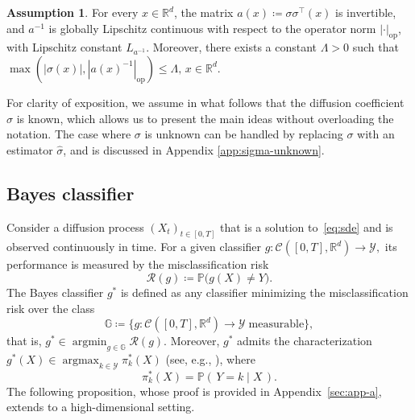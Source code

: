 \documentclass{article}
\theoremstyle{plain}
\theoremstyle{definition}
\newtheorem{assumption}[theorem]{Assumption}
\theoremstyle{remark}
\newcommand{\RD}{\mathbb{R}^{d}}
\DeclareMathOperator*{\argmax}{argmax}
\DeclareMathOperator*{\argmin}{argmin}
\begin{document}
\begin{assumption}\label{assump:main-theorem}
For every $x \in \mathbb{R}^d$, the matrix $a(x) \coloneqq \sigma\sigma^{\top}(x)$ is invertible, and $a^{-1}$ is globally Lipschitz continuous with respect to the operator norm $|\cdot|_{\mathrm{op}}$, with Lipschitz constant $L_{a^{-1}}$. Moreover, there exists a constant $\Lambda > 0$ such that $\max(|\sigma(x)|,|a(x)^{-1}|_{\mathrm{op}}) \leq \Lambda, \,x\in\RD$.
\end{assumption}


For clarity of exposition, we assume in what follows that the diffusion coefficient $\sigma$ is known, which allows us to present the main ideas without overloading the notation. The case where $\sigma$ is unknown can be handled by replacing $\sigma$ with an estimator $\widehat{\sigma}$, and is discussed in Appendix \ref{app:sigma-unknown}.



\subsection{Bayes classifier}
Consider a diffusion process $(X_t)_{t\in[0,T]}$ that is a solution to~\eqref{eq:sde}
and is observed continuously in time. For a given classifier
$
g : \mathcal{C}([0,T],\mathbb{R}^d) \to \mathcal{Y},
$
its performance is measured by the misclassification risk
\begin{equation}\label{eq:def-misclassification-risk}
\mathcal{R}(g) \coloneqq \mathbb{P}\big( g(X) \neq Y \big).
\end{equation}
The Bayes classifier $g^*$ is defined as any classifier minimizing the misclassification risk over the class
\[
\mathbb{G} \coloneqq \big\{ g : \mathcal{C}([0,T], \mathbb{R}^d) \to \mathcal{Y} \;\text{measurable} \big\},
\]
that is, 
$\displaystyle g^* \in \argmin_{g \in \mathbb{G}} \mathcal{R}(g).$   
Moreover, $g^*$ admits the characterization $\displaystyle g^*(X) \in \argmax_{k \in \mathcal{Y}} \pi_k^*(X)$ (see, e.g., \citet[Section 2.4]{Hastie2009elements}),  where 
\begin{equation}\label{eq:def-pi}
\pi_k^*(X) = \mathbb{P}(\,Y = k \mid X\,).  
\end{equation}
The following proposition, whose proof is provided in Appendix~\ref{sec:app-a}, extends \citet[Proposition~1]{Denis2020} to a high-dimensional setting.
\end{document}

